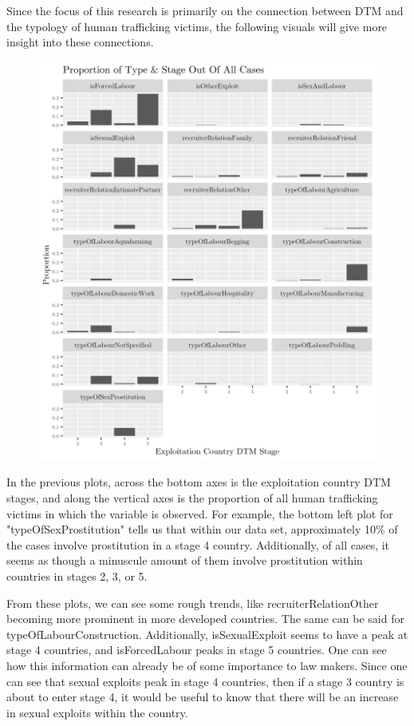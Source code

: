 \documentclass{article} %
\begin{document}
Since the focus of this research is primarily on the connection between DTM and the typology of human trafficking victims, the following visuals will give more insight into these connections.

\FloatBarrier
\begin{figure}[H]
	\includegraphics[width = \textwidth]{FacetPlot1}
\end{figure}
\FloatBarrier

In the previous plots, across the bottom axes is the exploitation country DTM stages, and along the vertical axes is the proportion of all human trafficking victims in which the variable is observed. For example, the bottom left plot for "typeOfSexProstitution" tells us that within our data set, approximately 10\% of the cases involve prostitution in a stage 4 country. Additionally, of all cases, it seems as though a minuscule amount of them involve prostitution within countries in stages 2, 3, or 5.

From these plots, we can see some rough trends, like recruiterRelationOther becoming more prominent in more developed countries. The same can be said for typeOfLabourConstruction. Additionally, isSexualExploit seems to have a peak at stage 4 countries, and isForcedLabour peaks in stage 5 countries. One can see how this information can already be of some importance to law makers. Since one can see that sexual exploits peak in stage 4 countries, then if a stage 3 country is about to enter stage 4, it would be useful to know that there will be an increase in sexual exploits within the country.



\printbibliography
\end{document}
